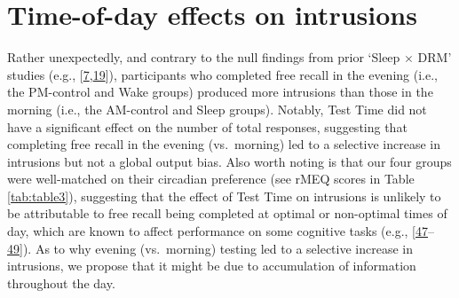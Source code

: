 \documentclass[
]{article}
\begin{document}
\hypertarget{time-of-day-effects-on-intrusions}{%
\section{Time-of-day effects on intrusions}\label{time-of-day-effects-on-intrusions}}

Rather unexpectedly, and contrary to the null findings from prior `Sleep \(\times\) DRM' studies (e.g., {[}\protect\hyperlink{ref-payne2009a}{7},\protect\hyperlink{ref-mckeon2012a}{19}{]}), participants who completed free recall in the evening (i.e., the PM-control and Wake groups) produced more intrusions than those in the morning (i.e., the AM-control and Sleep groups). Notably, Test Time did not have a significant effect on the number of total responses, suggesting that completing free recall in the evening (vs.~morning) led to a selective increase in intrusions but not a global output bias. Also worth noting is that our four groups were well-matched on their circadian preference (see rMEQ scores in Table \ref{tab:table3}), suggesting that the effect of Test Time on intrusions is unlikely to be attributable to free recall being completed at optimal or non-optimal times of day, which are known to affect performance on some cognitive tasks (e.g., {[}\protect\hyperlink{ref-hasher2002a}{47}--\protect\hyperlink{ref-may2005a}{49}{]}). As to why evening (vs.~morning) testing led to a selective increase in intrusions, we propose that it might be due to accumulation of information throughout the day.
\end{document}
